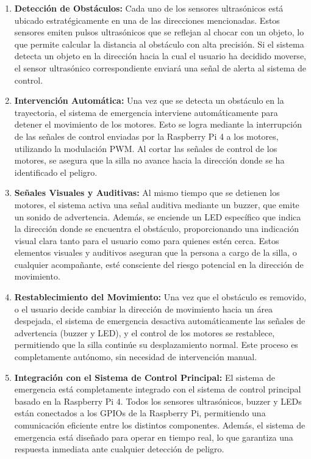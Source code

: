 \documentclass{article}
\begin{document}
\begin{enumerate}
    \item \textbf{Detección de Obstáculos:} Cada uno de los sensores ultrasónicos está ubicado estratégicamente en una de las direcciones mencionadas. Estos sensores emiten pulsos ultrasónicos que se reflejan al chocar con un objeto, lo que permite calcular la distancia al obstáculo con alta precisión. Si el sistema detecta un objeto en la dirección hacia la cual el usuario ha decidido moverse, el sensor ultrasónico correspondiente enviará una señal de alerta al sistema de control.
    \item \textbf{Intervención Automática:} Una vez que se detecta un obstáculo en la trayectoria, el sistema de emergencia interviene automáticamente para detener el movimiento de los motores. Esto se logra mediante la interrupción de las señales de control enviadas por la Raspberry Pi 4 a los motores, utilizando la modulación PWM. Al cortar las señales de control de los motores, se asegura que la silla no avance hacia la dirección donde se ha identificado el peligro.
    \item \textbf{Señales Visuales y Auditivas:} Al mismo tiempo que se detienen los motores, el sistema activa una señal auditiva mediante un buzzer, que emite un sonido de advertencia. Además, se enciende un LED específico que indica la dirección donde se encuentra el obstáculo, proporcionando una indicación visual clara tanto para el usuario como para quienes estén cerca. Estos elementos visuales y auditivos aseguran que la persona a cargo de la silla, o cualquier acompañante, esté consciente del riesgo potencial en la dirección de movimiento.
    \item \textbf{Restablecimiento del Movimiento:} Una vez que el obstáculo es removido, o el usuario decide cambiar la dirección de movimiento hacia un área despejada, el sistema de emergencia desactiva automáticamente las señales de advertencia (buzzer y LED), y el control de los motores se restablece, permitiendo que la silla continúe su desplazamiento normal. Este proceso es completamente autónomo, sin necesidad de intervención manual.
    \item \textbf{Integración con el Sistema de Control Principal:} El sistema de emergencia está completamente integrado con el sistema de control principal basado en la Raspberry Pi 4. Todos los sensores ultrasónicos, buzzer y LEDs están conectados a los GPIOs de la Raspberry Pi, permitiendo una comunicación eficiente entre los distintos componentes. Además, el sistema de emergencia está diseñado para operar en tiempo real, lo que garantiza una respuesta inmediata ante cualquier detección de peligro.
\end{enumerate}
\end{document}
